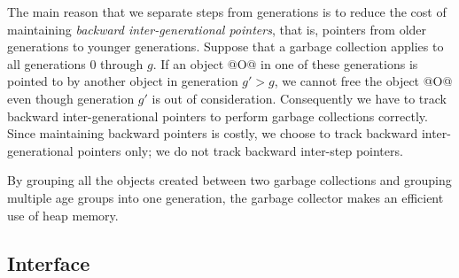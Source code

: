 \documentclass{article}
\begin{document}
The main reason that we separate steps from generations is to
reduce the cost of maintaining \emph{backward inter-generational pointers},
that is, pointers from older generations to younger generations.
Suppose that a garbage collection applies to all generations $0$
through $g$. If an object @O@ in one of these generations is pointed to
by another object in generation $g' > g$, we cannot free the object @O@
even though generation $g'$ is out of consideration. Consequently
we have to track backward inter-generational pointers to perform garbage
collections correctly.
Since maintaining backward pointers is costly, we
choose to track backward inter-generational pointers only;
we do not track backward inter-step pointers.

By grouping all the objects created between two garbage collections
and grouping multiple age groups into one generation, the garbage
collector makes an efficient use of heap memory.

\subsection{Interface}
\end{document}
